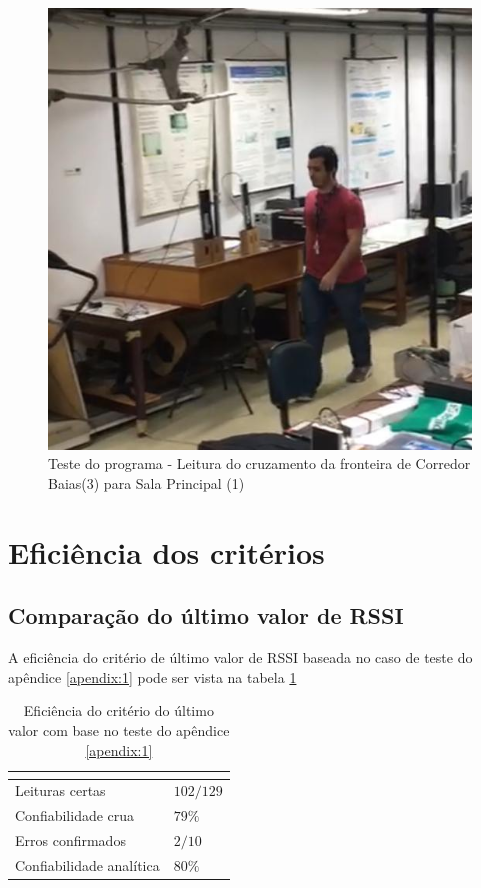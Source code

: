 \begin{figure}[H]
    \centering
    \includegraphics[width=0.5\linewidth]{figs/Resultados/cruzamento31.jpeg}
    \caption{Teste do programa - Leitura do cruzamento da fronteira de Corredor Baias(3) para Sala Principal (1)}
    \label{fig:cruzamento31}
\end{figure}

\section{Eficiência dos critérios}

\subsection{Comparação do último valor de RSSI} \label{section:ultimovalorRES}

A eficiência do critério de último valor de RSSI baseada no caso de teste do apêndice \ref{apendix:1} pode ser vista na tabela \ref{tab:resultados1}

\begin{table}[H]
\centering
\caption{Eficiência do critério do último valor com base no teste do apêndice \ref{apendix:1} }
\label{tab:resultados1}
\begin{tabular}{p{5cm} p{5cm}}
\hline
\multicolumn{2}{c}{\cellcolor{lightgray}{Eficiência do critério: Último valor de RSSI}} \\ \hline
Leituras certas         &   $102 / 129$        \\
Confiabilidade crua    &   $79\%$     \\
Erros confirmados          &  $2 /10$        \\
Confiabilidade analítica & $80\%$ \\ \hline
\end{tabular}
\end{table}

